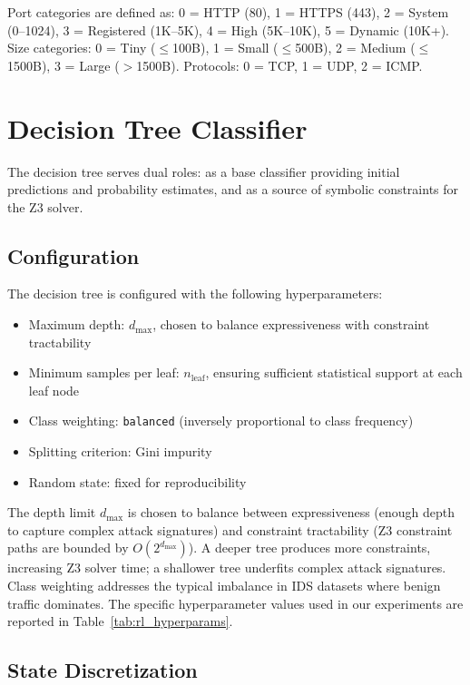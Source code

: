\documentclass[12pt, letterpaper, oneside]{report}
\begin{document}
\noindent Port categories are defined as: 0 = HTTP (80), 1 = HTTPS (443), 2 = System (0--1024), 3 = Registered (1K--5K), 4 = High (5K--10K), 5 = Dynamic (10K+). Size categories: 0 = Tiny ($\leq$100B), 1 = Small ($\leq$500B), 2 = Medium ($\leq$1500B), 3 = Large ($>$1500B). Protocols: 0 = TCP, 1 = UDP, 2 = ICMP.


\section{Decision Tree Classifier}
\label{sec:decision_tree}

The decision tree serves dual roles: as a base classifier providing initial predictions and probability estimates, and as a source of symbolic constraints for the Z3 solver.

\subsection{Configuration}

The decision tree is configured with the following hyperparameters:
\begin{itemize}
    \item Maximum depth: $d_{\max}$, chosen to balance expressiveness with constraint tractability
    \item Minimum samples per leaf: $n_{\text{leaf}}$, ensuring sufficient statistical support at each leaf node
    \item Class weighting: \texttt{balanced} (inversely proportional to class frequency)
    \item Splitting criterion: Gini impurity
    \item Random state: fixed for reproducibility
\end{itemize}

The depth limit $d_{\max}$ is chosen to balance between expressiveness (enough depth to capture complex attack signatures) and constraint tractability (Z3 constraint paths are bounded by $O(2^{d_{\max}})$). A deeper tree produces more constraints, increasing Z3 solver time; a shallower tree underfits complex attack signatures. Class weighting addresses the typical imbalance in IDS datasets where benign traffic dominates. The specific hyperparameter values used in our experiments are reported in Table~\ref{tab:rl_hyperparams}.

\subsection{State Discretization}
\end{document}
